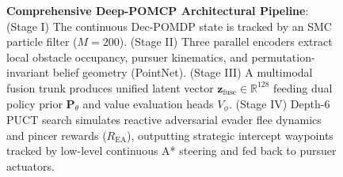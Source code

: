 \documentclass[conference]{IEEEtran}
\begin{document}
\begin{figure}[!t]
{%
}
\caption{\textbf{Comprehensive Deep-POMCP Architectural Pipeline}: (Stage I) The continuous Dec-POMDP state is tracked by an SMC particle filter ($M=200$). (Stage II) Three parallel encoders extract local obstacle occupancy, pursuer kinematics, and permutation-invariant belief geometry (PointNet). (Stage III) A multimodal fusion trunk produces unified latent vector $\mathbf{z}_{\text{fuse}} \in \mathbb{R}^{128}$ feeding dual policy prior $\mathbf{P}_\theta$ and value evaluation heads $V_\phi$. (Stage IV) Depth-6 PUCT search simulates reactive adversarial evader flee dynamics and pincer rewards ($R_{\text{EA}}$), outputting strategic intercept waypoints tracked by low-level continuous A* steering and fed back to pursuer actuators.}
\label{fig:architecture}
\end{figure}

\end{document}
